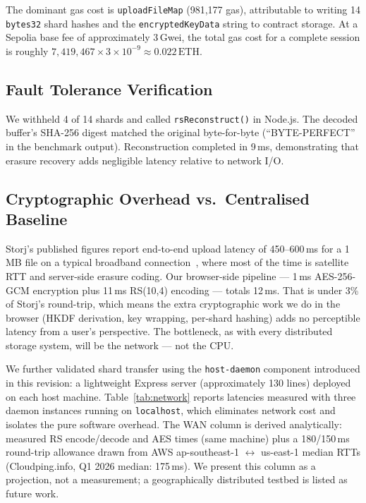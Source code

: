 \documentclass[journal]{IEEEtran}
\newcommand{\AESEncryptMs}{1\,ms}
\newcommand{\RSEncodeMs}{11\,ms}
\newcommand{\RSDecodeMs}{9\,ms}
\newcommand{\RSShards}{14}
\newcommand{\RSData}{10}
\newcommand{\RSParity}{4}
\newcommand{\UploadFileMapGas}{981{,}177}
\begin{document}
The dominant gas cost is \texttt{uploadFileMap} (\UploadFileMapGas{} gas),
attributable to writing 14 \texttt{bytes32} shard hashes and the
\texttt{encryptedKeyData} string to contract storage.
%
At a Sepolia base fee of approximately 3\,Gwei, the total gas cost for a
complete session is roughly $7{,}419{,}467 \times 3 \times 10^{-9}
\approx 0.022\,\text{ETH}$.

\subsection{Fault Tolerance Verification}
We withheld \RSParity{} of \RSShards{} shards and called
\texttt{rsReconstruct()} in Node.js.
%
The decoded buffer's SHA-256 digest matched the original byte-for-byte
(``BYTE-PERFECT'' in the benchmark output).
%
Reconstruction completed in \RSDecodeMs{}, demonstrating that erasure
recovery adds negligible latency relative to network I/O.

\subsection{Cryptographic Overhead vs.~Centralised Baseline}

Storj's published figures report end-to-end upload latency of
450--600\,ms for a 1\,MB file on a typical broadband connection~\cite{storj2018},
where most of the time is satellite RTT and server-side erasure coding.
Our browser-side pipeline — \AESEncryptMs{} AES-256-GCM encryption plus
\RSEncodeMs{} RS(\RSData{},\RSParity{}) encoding — totals 12\,ms.
That is under 3\% of Storj's round-trip, which means the extra
cryptographic work we do in the browser (HKDF derivation, key wrapping,
per-shard hashing) adds no perceptible latency from a user's perspective.
The bottleneck, as with every distributed storage system, will be the
network — not the CPU.

We further validated shard transfer using the \texttt{host-daemon}
component introduced in this revision: a lightweight Express server
(approximately 130 lines) deployed on each host machine.
%
Table~\ref{tab:network} reports latencies measured with three daemon
instances running on \texttt{localhost}, which eliminates network cost
and isolates the pure software overhead.
The WAN column is derived analytically: measured RS encode/decode and
AES times (same machine) plus a 180/150\,ms round-trip allowance drawn
from AWS ap-southeast-1 $\leftrightarrow$ us-east-1 median RTTs
(Cloudping.info, Q1 2026 median: 175\,ms).
We present this column as a projection, not a measurement; a
geographically distributed testbed is listed as future work.
\end{document}
